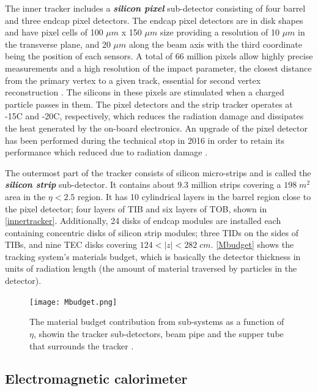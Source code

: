 The inner tracker includes a \textbf{\emph{silicon pixel}} sub-detector consisting of four barrel and three endcap pixel detectors. The endcap pixel detectors are in disk shapes and have pixel cells of 100 $\mu m$ x 150 $\mu m$ size providing a resolution of 10 $\mu m$ in the transverse plane, and 20 $\mu m$ along the beam axis with the third coordinate being the position of each sensors. A total of 66 million pixels allow highly precise measurements and a high resolution of the impact parameter, the closest distance from the primary vertex to a given track, essential for second vertex reconstruction \cite{innertracker, innertracker2}. The silicons in these pixels are stimulated when a charged particle passes in them. The pixel detectors and the strip tracker operates at -15\textdegree C and -20\textdegree C, respectively, which reduces the radiation damage and dissipates the heat generated by the on-board electronics. An upgrade of the pixel detector has been performed during the technical stop in 2016 in order to retain its performance which reduced due to radiation damage \cite{tracker3}.

The outermost part of the tracker consists of silicon micro-strips and is called the \textbf{\emph{silicon strip}} sub-detector. It contains about 9.3 million strips covering a $198\;m^2$ area in the $\eta < 2.5$ region. It has 10 cylindrical layers in the barrel region close to the pixel detector; four layers of TIB and six layers of TOB, shown in \autoref{innertracker}. Additionally, 24 disks of endcap modules are installed each containing concentric disks of silicon strip modules; three TIDs on the sides of TIBs, and nine TEC disks covering $124<|z|<282\;cm$. \autoref{Mbudget} shows the tracking system's materials budget, which is basically the detector thickness in units of radiation length (the amount of material traversed by particles in the detector).

\begin{figure}[ht]
	\centering
	\texttt{[image: Mbudget.png]}
	\vspace{2mm}
	\caption[The material budget contribution from sub-systems as a function of $\eta$, showin the tracker sub-detectors, beam pipe and the supper tube that surrounds the tracker.]{The material budget contribution from sub-systems as a function of $\eta$, showin the tracker sub-detectors, beam pipe and the supper tube that surrounds the tracker \cite{Mbudget}.}
	\label{Mbudget}
\end{figure}

\subsection{Electromagnetic calorimeter}\label{ecalsubsection}

